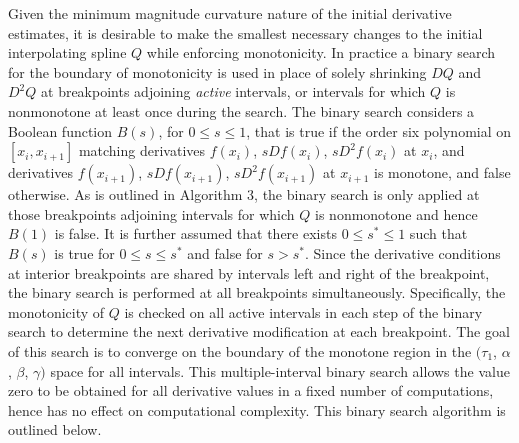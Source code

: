 Given the minimum magnitude curvature nature of the initial derivative
estimates, it is desirable to make the smallest necessary changes to
the initial interpolating spline $Q$ while enforcing monotonicity. In
practice a binary search for the boundary of monotonicity is used in
place of solely shrinking $DQ$ and $D^2Q$ at breakpoints adjoining
{\it active} intervals, or intervals for which $Q$ is nonmonotone at
least once during the search. The binary search considers a Boolean
function $B(s)$, for $0 \le s \le 1$, that is true if the order six
polynomial on $[x_i, x_{i+1}]$ matching derivatives $f(x_i)$, $s
Df(x_i)$, $s D^2f(x_i)$ at $x_i$, and derivatives $f(x_{i+1})$, $s
Df(x_{i+1})$, $s D^2f(x_{i+1})$ at $x_{i+1}$ is monotone, and false
otherwise. As is outlined in Algorithm 3, the binary search is only
applied at those breakpoints adjoining intervals for which $Q$ is
nonmonotone and hence $B(1)$ is false. It is further assumed that
there exists $0 \le s^* \le 1$ such that $B(s)$ is true for $0 \le s
\le s^*$ and false for $s > s^*$. Since the derivative conditions at
interior breakpoints are shared by intervals left and right of the
breakpoint, the binary search is performed at all breakpoints
simultaneously.  Specifically, the monotonicity of $Q$ is checked on
all active intervals in each step of the binary search to determine
the next derivative modification at each breakpoint. The goal of this
search is to converge on the boundary of the monotone region in the
$(\tau_1$, $\alpha$, $\beta$, $\gamma)$ space for all intervals. This
multiple-interval binary search allows the value zero to be obtained
for all derivative values in a fixed number of computations, hence has
no effect on computational complexity. This binary search algorithm is
outlined below.


